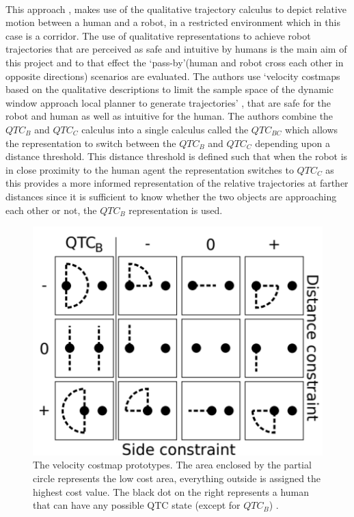 	 \paragraph{}This approach \cite{dondrup2016qualitative}, makes use of the qualitative trajectory calculus to depict relative motion between a human and a robot, in a restricted environment which in this case is a corridor. The use of qualitative representations to achieve robot trajectories that are perceived as safe and intuitive by humans is the main aim of this project and to that effect the `pass-by'(human and robot cross each other in opposite directions) scenarios are evaluated. The authors use `velocity costmaps based on the qualitative descriptions to limit the sample space of the dynamic window approach local planner to generate trajectories' \cite{dondrup2016qualitative}, that are safe for the robot and human as well as intuitive for the human. The authors combine the $QTC_B$ and $QTC_C$ calculus into a single calculus called the $QTC_{BC}$ which allows the representation to switch between the $QTC_B$ and $QTC_C$ depending upon a distance threshold. This distance threshold is defined such that when the robot is in close proximity to the human agent the representation switches to $QTC_C$ as this provides a more informed representation of the relative trajectories at farther distances since it is sufficient to know whether the two objects are approaching each other or not, the $QTC_B$ representation is used. 
	\begin{figure}[h]
		\centering
		\includegraphics[scale = 0.7]{images/qtcbc}
		\caption{The velocity costmap prototypes. The area enclosed by the partial circle represents the low cost area, everything outside is assigned the highest cost value. The black dot on the right represents a human that can have any possible QTC state (except for $QTC_B$) \cite{dondrup2016qualitative}.}
		\label{fig:qtcbc}
	\end{figure}
	
